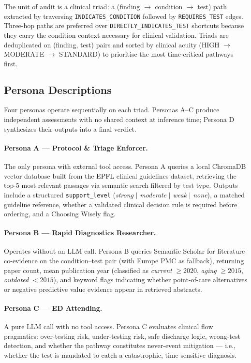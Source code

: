 The unit of audit is a clinical triad: a (finding $\rightarrow$ condition
$\rightarrow$ test) path extracted by traversing \texttt{INDICATES\_CONDITION}
followed by \texttt{REQUIRES\_TEST} edges. Three-hop paths are preferred over
\texttt{DIRECTLY\_INDICATES\_TEST} shortcuts because they carry the condition
context necessary for clinical validation. Triads are deduplicated on (finding,
test) pairs and sorted by clinical acuity (HIGH $\rightarrow$ MODERATE
$\rightarrow$ STANDARD) to prioritise the most time-critical pathways first.

\subsection*{Persona Descriptions}

Four personas operate sequentially on each triad. Personas A--C produce
independent assessments with no shared context at inference time; Persona D
synthesizes their outputs into a final verdict.

\paragraph{Persona A — Protocol \& Triage Enforcer.}
The only persona with external tool access. Persona A queries a local ChromaDB
vector database built from the EPFL clinical guidelines dataset, retrieving the
top-5 most relevant passages via semantic search filtered by test type. Outputs
include a structured \texttt{support\_level} (\textit{strong} $|$
\textit{moderate} $|$ \textit{weak} $|$ \textit{none}), a matched guideline
reference, whether a validated clinical decision rule is required before
ordering, and a Choosing Wisely flag.

\paragraph{Persona B — Rapid Diagnostics Researcher.}
Operates without an LLM call. Persona B queries Semantic Scholar for literature
co-evidence on the condition--test pair (with Europe PMC as fallback), returning
paper count, mean publication year (classified as \textit{current} $\geq 2020$,
\textit{aging} $\geq 2015$, \textit{outdated} $< 2015$), and keyword flags
indicating whether point-of-care alternatives or negative predictive value
evidence appear in retrieved abstracts.

\paragraph{Persona C — ED Attending.}
A pure LLM call with no tool access. Persona C evaluates clinical flow
pragmatics: over-testing risk, under-testing risk, safe discharge logic,
wrong-test detection, and whether the pathway constitutes never-event mitigation
— i.e., whether the test is mandated to catch a catastrophic, time-sensitive
diagnosis.

